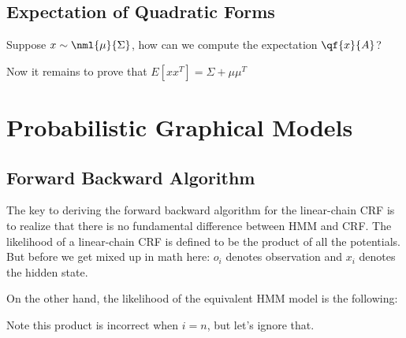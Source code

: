 \documentclass[12pt]{article}
\begin{document}
\subsection{Expectation of Quadratic Forms}

Suppose $x \sim \nml{\mu}{\Sigma}$, how can we compute the expectation $\qf{x}{A}$?


Now it remains to prove that $E[xx^T] = \Sigma + \mu\mu^T$


\section{Probabilistic Graphical Models}
\subsection{Forward Backward Algorithm}

The key to deriving the forward backward algorithm for the linear-chain CRF is to realize that there is no fundamental difference between HMM and CRF.
The likelihood of a linear-chain CRF is defined to be the product of all the potentials. But before we get mixed up in math here: $o_i$ denotes observation and $x_i$ denotes the hidden state.


On the other hand, the likelihood of the equivalent HMM model is the following:

Note this product is incorrect when $i = n$, but let's ignore that.
\end{document}
